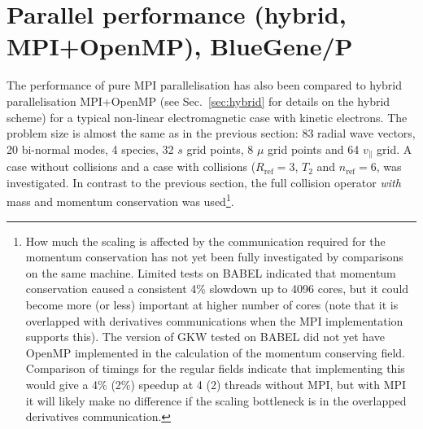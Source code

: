 \section{Parallel performance (hybrid, MPI+OpenMP), BlueGene/P \label{sec:bluegene}}
The performance of pure MPI parallelisation has also been compared to hybrid parallelisation MPI+OpenMP (see Sec.~\ref{sec:hybrid} for details on the hybrid scheme) for a typical non-linear electromagnetic case with kinetic electrons. The problem size is almost the same as in the previous section: 83 radial wave vectors, 20 bi-normal modes, 4 species, 32 $s$ grid points, 8 $\mu$ grid points and 64 $v_\parallel$ grid. A case without collisions and a case with collisions ($R_\textrm{ref}=3$, $T_\textrm{2}$ and $n_\textrm{ref}=6$, was investigated.  In contrast to the previous section, the full collision operator \textit{with} mass and momentum conservation was used\footnote{How much the scaling is affected by the communication required for the momentum conservation has not yet been fully investigated by comparisons on the same machine. Limited tests on BABEL indicated that momentum conservation caused a consistent 4\% slowdown up to 4096 cores, but it could become more (or less) important at higher number of cores (note that it is overlapped with derivatives communications when the MPI implementation supports this).  The version of GKW tested on BABEL did not yet have OpenMP implemented in the calculation of the momentum conserving field. Comparison of timings for the regular fields indicate that implementing this would give a 4\% (2\%) speedup at 4 (2) threads without MPI, but with MPI it will likely make no difference if the scaling bottleneck is in the overlapped derivatives communication.}.

